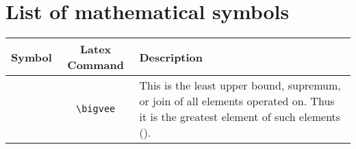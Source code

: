 \documentclass[9pt,oneside]{amsart}
\begin{document}
\section{List of mathematical symbols}\label{app:symbols}
\begin{tabularx}{\textwidth}{lcX}
\toprule
Symbol & Latex Command & Description \\
\midrule
\hypertarget{bigvee}{
$\bigvee$ & \verb|\bigvee| & This is the least upper bound, supremum, or join of all elements operated on. Thus it is the greatest element of such elements (\cite{LatticeOrder}).}\\
\bottomrule
\end{tabularx}
\end{document}
